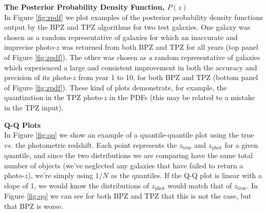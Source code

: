 \documentclass[DM,lsstdraft,toc]{lsstdoc}
\begin{document}
\smallskip \noindent \textbf{The Posterior Probability Density Function, $P(z)$} \\
In Figure \ref{fig:zpdf} we plot examples of the posterior probability density functions output by the BPZ and TPZ algorithms for two test galaxies. One galaxy was chosen as a random representative of galaxies for which an inaccurate and imprecise photo-$z$ was returned from both BPZ and TPZ for all years (top panel of Figure \ref{fig:zpdf}). The other was chosen as a random representative of galaxies which experienced a large and consistent improvement in both the accuracy and precision of its photo-$z$ from year 1 to 10, for both BPZ and TPZ (bottom panel of Figure \ref{fig:zpdf}). These kind of plots demonstrate, for example, the quantization in the TPZ photo-$z$ in the PDFs (this may be related to a mistake in the TPZ input).

\smallskip \noindent \textbf{Q-Q Plots} \\
In Figure \ref{fig:qq} we show an example of a quantile-quantile plot using the true $vs.$ the photometric redshift. Each point represents the $z_\mathrm{true}$ and $z_\mathrm{phot}$ for a given quantile, and since the two distributions we are comparing have the same total number of objects (we've neglected any galaxies that have failed to return a photo-$z$), we're simply using $1/N$ as the quantiles. If the Q-Q plot is linear with a slope of 1, we would know the distributions of $z_\mathrm{phot}$ would match that of $z_\mathrm{true}$. In Figure \ref{fig:qq} we can see for both BPZ and TPZ that this is not the case, but that BPZ is worse.

\clearpage
\end{document}

